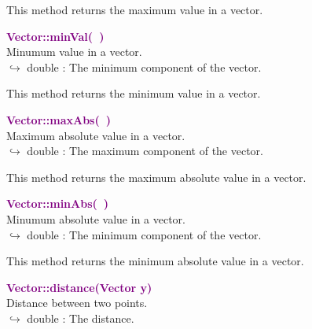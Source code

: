 This method returns the maximum value in a vector.

\textcolor{purple}{\textbf{Vector::minVal(~)}}\label{Vector::minVal()}\\
Minumum value in a vector.\\ \hspace*{10mm}$\hookrightarrow$ double : The minimum component of the vector.

This method returns the minimum value in a vector.

\textcolor{purple}{\textbf{Vector::maxAbs(~)}}\label{Vector::maxAbs()}\\
Maximum absolute value in a vector.\\ \hspace*{10mm}$\hookrightarrow$ double : The maximum component of the vector.

This method returns the maximum absolute value in a vector.

\textcolor{purple}{\textbf{Vector::minAbs(~)}}\label{Vector::minAbs()}\\
Minumum absolute value in a vector.\\ \hspace*{10mm}$\hookrightarrow$ double : The minimum component of the vector.

This method returns the minimum absolute value in a vector.

\textcolor{purple}{\textbf{Vector::distance(Vector y)}}\label{Vector::distance(Vector y)}\\
Distance between two points.\\ \hspace*{10mm}$\hookrightarrow$ double : The distance.

